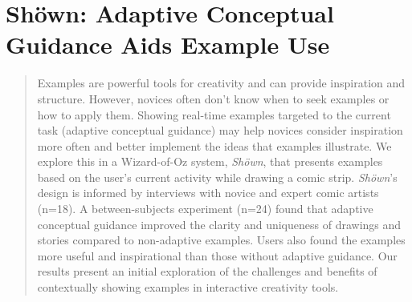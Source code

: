 \chapter{Sh\"{o}wn: Adaptive Conceptual Guidance Aids Example Use}
\label{chapter:shown}
\begin{quote}
    Examples are powerful tools for creativity and can provide inspiration and structure. However, novices often don't know when to seek examples or how to apply them. 
    Showing real-time examples targeted to the current task (adaptive conceptual guidance) may help novices consider inspiration more often and better implement the ideas that examples illustrate.
    We explore this in a Wizard-of-Oz system, \textit{Sh{\"o}wn}, that presents examples based on the user's current activity while drawing a comic strip. \textit{Sh{\"o}wn}'s design is informed by interviews with novice and expert comic artists (n=18). A between-subjects experiment (n=24) found that adaptive conceptual guidance improved the clarity and uniqueness of drawings and stories compared to non-adaptive examples. Users also found the examples more useful and inspirational than those without adaptive guidance. Our results present an initial exploration of the challenges and benefits of contextually showing examples in interactive creativity tools.
\end{quote}

% 



